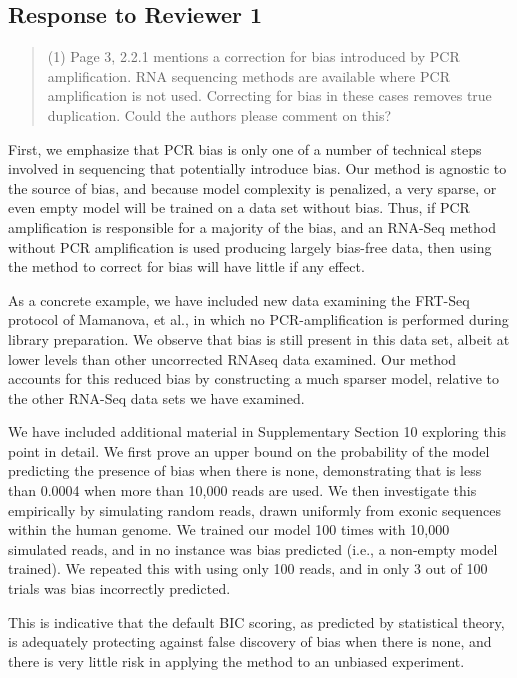 \documentclass{article}
\begin{document}
\subsection*{Response to Reviewer 1}

\begin{quote}
(1) Page 3, 2.2.1 mentions a correction for bias introduced by PCR amplification.
RNA sequencing methods are available where PCR amplification is not used.
Correcting for bias in these cases removes true duplication.  Could the authors
please comment on this?
\end{quote}

First, we emphasize that PCR bias is only one of a number of technical steps
involved in sequencing that potentially introduce bias.  Our method is agnostic
to the source of bias, and because model complexity is penalized, a very sparse,
or even empty model will be trained on a data set without bias.  Thus, if PCR
amplification is responsible for a majority of the bias, and an RNA-Seq method
without PCR amplification is used producing largely bias-free data, then using
the method to correct for bias will have little if any effect.

As a concrete example, we have included new data examining the FRT-Seq protocol
of Mamanova, et al., in which no PCR-amplification is performed during library
preparation. We observe that bias is still present in this data set, albeit at
lower levels than other uncorrected RNAseq data examined.  Our method accounts
for this reduced bias by constructing a much sparser model, relative to the
other RNA-Seq data sets we have examined.

We have included additional material in Supplementary Section 10 exploring this
point in detail. We first prove an upper bound on the probability of the model
predicting the presence of bias when there is none, demonstrating that is less
than 0.0004 when more than 10,000 reads are used. We then investigate this
empirically by simulating random reads, drawn uniformly from exonic sequences
within the human genome.  We trained our model 100 times with 10,000 simulated
reads, and in no instance was bias predicted (i.e., a non-empty model trained).
We repeated this with using only 100 reads, and in only 3 out of 100 trials was
bias incorrectly predicted.

This is indicative that the default BIC scoring, as predicted by statistical
theory, is adequately protecting against false discovery of bias when there is
none, and there is very little risk in applying the method to an unbiased
experiment.
\end{document}
